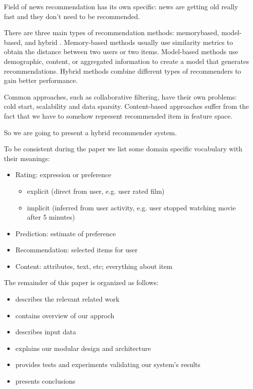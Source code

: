 \documentclass{article}
\begin{document}
    Field of news recommendation has its own specific: news are getting old really fast and they don't need to be recommended.

     There are three main types of recommendation methods: memorybased, model-based, and hybrid \citep{survey}. Memory-based methods \citep{memory} usually use similarity metrics to obtain the distance between two users or two items. Model-based methods use demographic, content, or aggregated information to create a model that generates recommendations. Hybrid \citep{combining} methods combine different types of recommenders to gain better performance.

    Common approaches, such as collaborative filtering, have their own problems: cold start, scalability and data sparsity. Content-based approaches suffer from the fact that we have to somehow represent recommended item in feature space.

    So we are going to present a hybrid recommender system.
    
    To be consistent during the paper we list some domain specific vocabulary with their meanings:

        \begin{itemize}
            \item Rating: expression or preference

                \begin{itemize}
                    \item explicit (direct from user, e.g. user rated film)
                    \item implicit (inferred from user activity, e.g. user stopped watching movie after 5 minutes)
                \end{itemize}
            \item Prediction: estimate of preference
            \item Recommendation: selected items for user
            \item Content: attributes, text, etc; everything about item
        \end{itemize}


    The remainder of this paper is organized as follows:
    
        \begin{itemize}
            \item {} describes the relevant related work
            \item {} contains overview of our approch
            \item {} describes input data
            \item {} explains our modular design and architecture
            \item {} provides tests and experiments validating
our system’s results
            \item {} presents conclusions

        \end{itemize}
\end{document}
